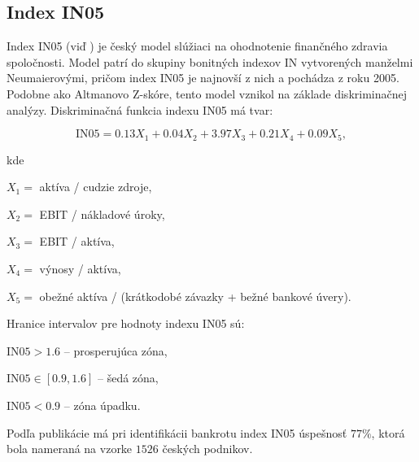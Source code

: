 \subsection{Index IN05}

Index IN05 (viď \cite{neumaier1}) je český model slúžiaci na ohodnotenie finančného zdravia spoločnosti.
Model patrí do skupiny bonitných indexov IN vytvorených manželmi Neumaierovými, pričom index IN05 je najnovší z nich a pochádza z roku 2005.
Podobne ako Altmanovo Z-skóre, tento model vznikol na základe diskriminačnej analýzy. Diskriminačná funkcia indexu IN05 má tvar:

\[
    \text{IN05} = 0.13X_1 + 0.04X_2 + 3.97X_3 + 0.21X_4 + 0.09X_5,
\]

kde

\(X_1 = \) aktíva / cudzie zdroje,

\(X_2 = \) EBIT / nákladové úroky,

\(X_3 = \) EBIT / aktíva,

\(X_4 = \) výnosy / aktíva,

\(X_5 = \) obežné aktíva / (krátkodobé závazky + bežné bankové úvery).
\bigskip

Hranice intervalov pre hodnoty indexu IN05 sú:

\( \text{IN05} > 1.6\) – prosperujúca zóna,

\( \text{IN05} \in [0.9, 1.6]\) – šedá zóna,

\( \text{IN05} < 0.9 \) – zóna úpadku.
\bigskip

Podľa publikácie \cite{sav} má pri identifikácii bankrotu index IN05 úspešnosť \(77 \%\), ktorá bola nameraná na vzorke \( 1526 \) českých podnikov.

